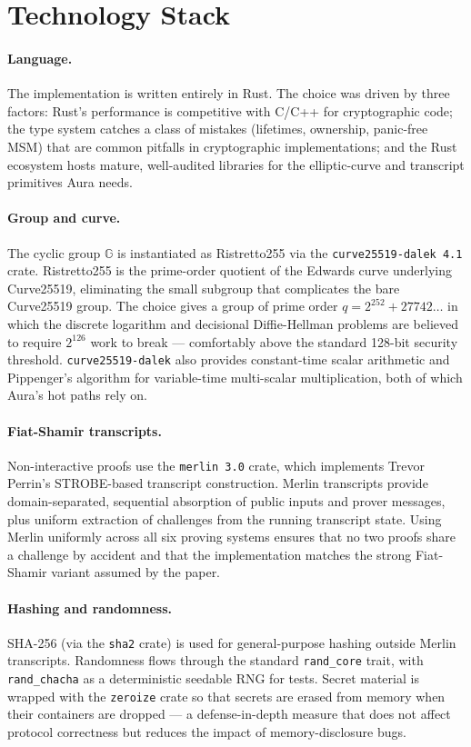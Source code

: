 \documentclass[12pt,a4paper,oneside]{report}
\begin{document}
\section{Technology Stack}
\label{sec:impl-stack}

\paragraph{Language.}
The implementation is written entirely in Rust. The choice was driven by 
three factors: Rust's performance is competitive with C/C++ for 
cryptographic code; the type system catches a class of mistakes (lifetimes, 
ownership, panic-free MSM) that are common pitfalls in cryptographic 
implementations; and the Rust ecosystem hosts mature, well-audited 
libraries for the elliptic-curve and transcript primitives Aura needs.

\paragraph{Group and curve.}
The cyclic group $\mathbb{G}$ is instantiated as Ristretto255 via the 
\texttt{curve25519-dalek 4.1} crate. Ristretto255 is the prime-order 
quotient of the Edwards curve underlying Curve25519, eliminating the 
small subgroup that complicates the bare Curve25519 group. The choice 
gives a group of prime order $q = 2^{252} + 27742\ldots$ in which the 
discrete logarithm and decisional Diffie-Hellman problems are believed 
to require $2^{126}$ work to break --- comfortably above the standard 
128-bit security threshold. \texttt{curve25519-dalek} also provides 
constant-time scalar arithmetic and Pippenger's algorithm for variable-time 
multi-scalar multiplication, both of which Aura's hot paths rely on.

\paragraph{Fiat-Shamir transcripts.}
Non-interactive proofs use the \texttt{merlin 3.0} crate, which implements 
Trevor Perrin's STROBE-based transcript construction. Merlin transcripts 
provide domain-separated, sequential absorption of public inputs and 
prover messages, plus uniform extraction of challenges from the running 
transcript state. Using Merlin uniformly across all six proving systems 
ensures that no two proofs share a challenge by accident and that the 
implementation matches the strong Fiat-Shamir variant assumed by the paper.

\paragraph{Hashing and randomness.}
SHA-256 (via the \texttt{sha2} crate) is used for general-purpose hashing 
outside Merlin transcripts. Randomness flows through the standard 
\texttt{rand\_core} trait, with \texttt{rand\_chacha} as a deterministic 
seedable RNG for tests. Secret material is wrapped with the \texttt{zeroize} 
crate so that secrets are erased from memory when their containers are 
dropped --- a defense-in-depth measure that does not affect protocol 
correctness but reduces the impact of memory-disclosure bugs.
\end{document}
